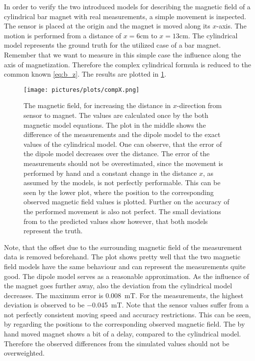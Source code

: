 In order to verify the two introduced models for describing the magnetic field of a cylindrical bar magnet with real measurements, a simple movement is inspected. The sensor is placed at the origin and the magnet is moved along its $ x $-axis. The motion is performed from a distance of $ x=6\si{\cm} $ to $ x=13\si{\cm} $. The cylindrical model represents the ground truth for the utilized case of a bar magnet. Remember that we want to measure in this simple case the influence along the axis of magnetization. Therefore the complex cylindrical formula is reduced to the common known \ref{eq:b_z}. The results are plotted in \ref{fig:modCompFlat}.
\begin{figure}[!htb]
\centering
\texttt{[image: pictures/plots/compX.png]}
\caption[Comparing the models and sensor measurements for flat movement]
{The magnetic field, for increasing the distance in $ x $-direction from sensor to magnet. The values are calculated once by the both magnetic model equations. The plot in the middle shows the difference of the measurements and the dipole model to the exact values of the cylindrical model. One can observe, that the error of the dipole model decreases over the distance. The error of the measurements should not be overestimated, since the movement is performed by hand and a constant change in the distance $ x $, as assumed by the models, is not perfectly performable. This can be seen by the lower plot, where the position to the corresponding observed magnetic field values is plotted. Further on the accuracy of the performed movement is also not perfect. The small deviations from to the predicted values show however, that both models represent the truth.}
\label{fig:modCompFlat}
\end{figure}
Note, that the offset due to the surrounding magnetic field of the measurement data is removed beforehand. The plot shows pretty well that the two magnetic field models have the same behaviour and can represent the measurements quite good. The dipole model serves as a reasonable approximation. As the influence of the magnet goes further away, also the deviation from the cylindrical model decreases. The maximum error is \SI{0.008}{\milli \tesla}. For the measurements, the highest deviation is observed to be \SI{-0.045}{\milli \tesla}. Note that the sensor values suffer from a not perfectly consistent moving speed and accuracy restrictions. This can be seen, by regarding the positions to the corresponding observed magnetic field. The by hand moved magnet shows a bit of a \grqq delay\grqq, compared to the cylindrical model. Therefore the observed differences from the simulated values should not be overweighted.


